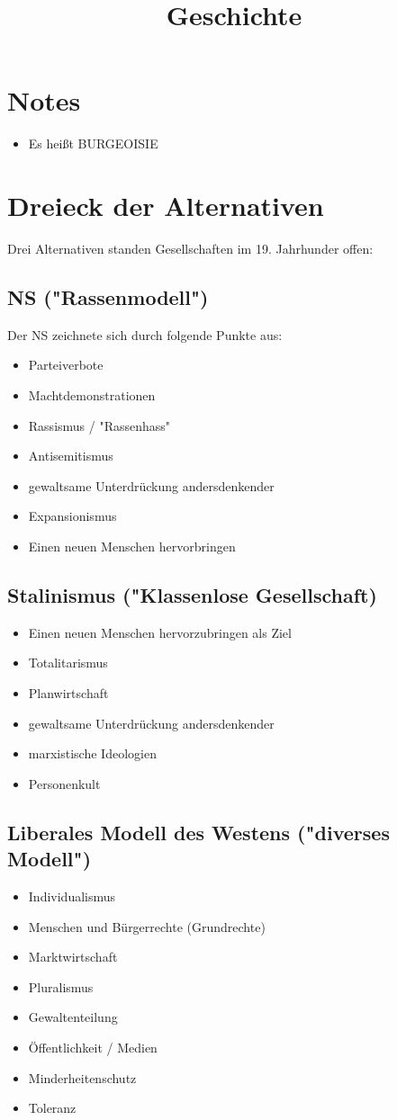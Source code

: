 \documentclass{article}
\title{Geschichte}
\begin{document}
\maketitle
\section*{Notes}
\begin{itemize}
    \item Es heißt BURGEOISIE
\end{itemize}
\section*{Dreieck der Alternativen}
Drei Alternativen standen Gesellschaften im 19. Jahrhunder offen:
\subsection*{NS ("Rassenmodell")}
Der NS zeichnete sich durch folgende Punkte aus:
\begin{itemize}
    \item Parteiverbote
    \item Machtdemonstrationen
    \item Rassismus / "Rassenhass"
    \item Antisemitismus
    \item gewaltsame Unterdrückung andersdenkender
    \item Expansionismus
    \item Einen neuen Menschen hervorbringen
\end{itemize}
\subsection*{Stalinismus ("Klassenlose Gesellschaft)}
\begin{itemize}
    \item Einen neuen Menschen hervorzubringen als Ziel
    \item Totalitarismus
    \item Planwirtschaft
    \item gewaltsame Unterdrückung andersdenkender
    \item marxistische Ideologien
    \item Personenkult
\end{itemize}
\subsection*{Liberales Modell des Westens ("diverses Modell")}
\begin{itemize}
    \item Individualismus
    \item Menschen und Bürgerrechte (Grundrechte)
    \item Marktwirtschaft
    \item Pluralismus
    \item Gewaltenteilung
    \item Öffentlichkeit / Medien
    \item Minderheitenschutz
    \item Toleranz
\end{itemize}
\end{document}
